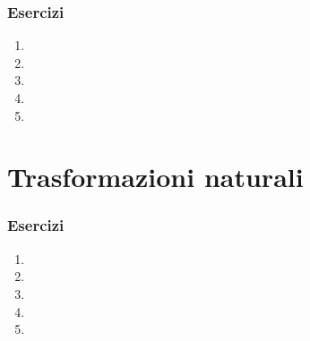 
\subsubsection*{Esercizi}
\begin{enumerate}
    \item 
    \item 
    \item 
    \item 
    \item 
\end{enumerate}


\section{Trasformazioni naturali}

\subsubsection*{Esercizi}
\begin{enumerate}
    \item 
    \item 
    \item 
    \item 
    \item 
\end{enumerate}

